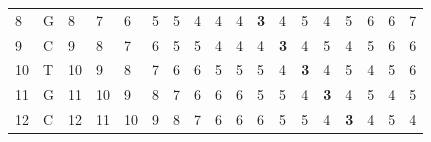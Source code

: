\documentclass[times, utf8, zavrsni]{fer}
\begin{document}
\begin{table}[]
\begin{tabular}{|ll|llllllllllllllll|}
\multicolumn{1}{|l|}{8}  & G & \multicolumn{1}{l|}{8}          & \multicolumn{1}{l|}{7}          & \multicolumn{1}{l|}{6}          & \multicolumn{1}{l|}{5}          & \multicolumn{1}{l|}{5}          & \multicolumn{1}{l|}{4}          & \multicolumn{1}{l|}{4}          & \multicolumn{1}{l|}{4}          & \multicolumn{1}{l|}{\textbf{3}} & \multicolumn{1}{l|}{4}          & \multicolumn{1}{l|}{5}          & \multicolumn{1}{l|}{4}          & \multicolumn{1}{l|}{5}          & \multicolumn{1}{l|}{6}  & \multicolumn{1}{l|}{6}  & 7  \\ \cline{3-18} 
\multicolumn{1}{|l|}{9}  & C & \multicolumn{1}{l|}{9}          & \multicolumn{1}{l|}{8}          & \multicolumn{1}{l|}{7}          & \multicolumn{1}{l|}{6}          & \multicolumn{1}{l|}{5}          & \multicolumn{1}{l|}{5}          & \multicolumn{1}{l|}{4}          & \multicolumn{1}{l|}{4}          & \multicolumn{1}{l|}{4}          & \multicolumn{1}{l|}{\textbf{3}} & \multicolumn{1}{l|}{4}          & \multicolumn{1}{l|}{5}          & \multicolumn{1}{l|}{4}          & \multicolumn{1}{l|}{5}  & \multicolumn{1}{l|}{6}  & 6  \\ \cline{3-18} 
\multicolumn{1}{|l|}{10} & T & \multicolumn{1}{l|}{10}         & \multicolumn{1}{l|}{9}          & \multicolumn{1}{l|}{8}          & \multicolumn{1}{l|}{7}          & \multicolumn{1}{l|}{6}          & \multicolumn{1}{l|}{6}          & \multicolumn{1}{l|}{5}          & \multicolumn{1}{l|}{5}          & \multicolumn{1}{l|}{5}          & \multicolumn{1}{l|}{4}          & \multicolumn{1}{l|}{\textbf{3}} & \multicolumn{1}{l|}{4}          & \multicolumn{1}{l|}{5}          & \multicolumn{1}{l|}{4}  & \multicolumn{1}{l|}{5}  & 6  \\ \cline{3-18} 
\multicolumn{1}{|l|}{11} & G & \multicolumn{1}{l|}{11}         & \multicolumn{1}{l|}{10}         & \multicolumn{1}{l|}{9}          & \multicolumn{1}{l|}{8}          & \multicolumn{1}{l|}{7}          & \multicolumn{1}{l|}{6}          & \multicolumn{1}{l|}{6}          & \multicolumn{1}{l|}{6}          & \multicolumn{1}{l|}{5}          & \multicolumn{1}{l|}{5}          & \multicolumn{1}{l|}{4}          & \multicolumn{1}{l|}{\textbf{3}} & \multicolumn{1}{l|}{4}          & \multicolumn{1}{l|}{5}  & \multicolumn{1}{l|}{4}  & 5  \\ \cline{3-18} 
\multicolumn{1}{|l|}{12} & C & \multicolumn{1}{l|}{12}         & \multicolumn{1}{l|}{11}         & \multicolumn{1}{l|}{10}         & \multicolumn{1}{l|}{9}          & \multicolumn{1}{l|}{8}          & \multicolumn{1}{l|}{7}          & \multicolumn{1}{l|}{6}          & \multicolumn{1}{l|}{6}          & \multicolumn{1}{l|}{6}          & \multicolumn{1}{l|}{5}          & \multicolumn{1}{l|}{5}          & \multicolumn{1}{l|}{4}          & \multicolumn{1}{l|}{\textbf{3}} & \multicolumn{1}{l|}{4}  & \multicolumn{1}{l|}{5}  & 4  \\ \hline

\end{tabular}
\end{table}
\end{document}
